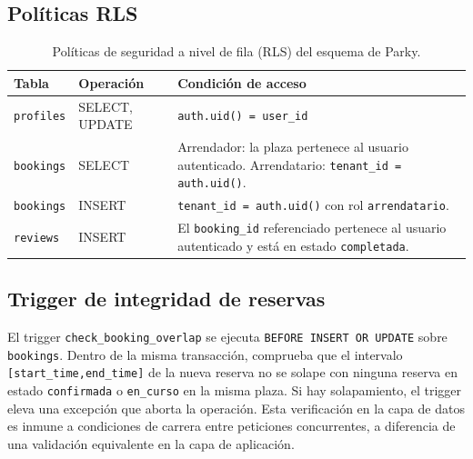 \subsection{Políticas RLS}
\label{subsec:rls}

\begin{table}[htbp]
\centering
\caption{Políticas de seguridad a nivel de fila (RLS) del esquema de Parky.}
\label{tab:rls-policies}
\begin{tabularx}{\textwidth}{llX}
\toprule
\textbf{Tabla} & \textbf{Operación} & \textbf{Condición de acceso} \\
\midrule
\rowcolor{gray!5}
\texttt{profiles}  & SELECT, UPDATE & \texttt{auth.uid() = user\_id} \\
\texttt{bookings}  & SELECT         & Arrendador: la plaza pertenece al usuario autenticado. Arrendatario: \texttt{tenant\_id = auth.uid()}. \\
\rowcolor{gray!5}
\texttt{bookings}  & INSERT         & \texttt{tenant\_id = auth.uid()} con rol \texttt{arrendatario}. \\
\texttt{reviews}   & INSERT         & El \texttt{booking\_id} referenciado pertenece al usuario autenticado y está en estado \texttt{completada}. \\
\bottomrule
\end{tabularx}
\end{table}

\subsection{Trigger de integridad de reservas}
\label{subsec:triggers}

El trigger \texttt{check\_booking\_overlap} se ejecuta \texttt{BEFORE INSERT OR UPDATE} sobre \texttt{bookings}. Dentro de la misma transacción, comprueba que el intervalo \texttt{[start\_time,\;end\_time]} de la nueva reserva no se solape con ninguna reserva en estado \texttt{confirmada} o \texttt{en\_curso} en la misma plaza. Si hay solapamiento, el trigger eleva una excepción que aborta la operación. Esta verificación en la capa de datos es inmune a condiciones de carrera entre peticiones concurrentes, a diferencia de una validación equivalente en la capa de aplicación.
